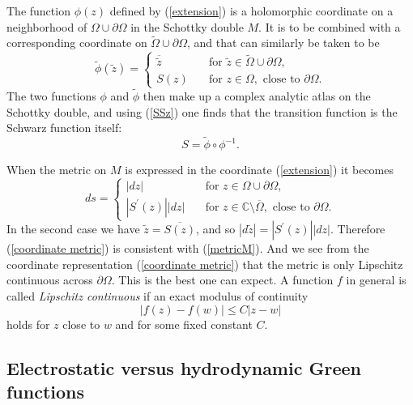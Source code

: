 \documentclass[reqno,12pt]{article}
\theoremstyle{plain}
\theoremstyle{definition}
\numberwithin{equation}{section}
\numberwithin{figure}{section}
\def\C{{\mathbb C}}
\begin{document}
The function $\phi(z)$ defined by (\ref{extension}) is a holomorphic coordinate on a neighborhood of $\Omega\cup\partial\Omega$
in the Schottky double $M$. It is to be combined with a corresponding coordinate on $\tilde{\Omega}\cup\partial\Omega$,
and that can similarly be taken to be
\begin{equation}\label{extensionbackside}
\tilde{\phi}(\tilde{z})=
\begin{cases}
\overline{\tilde{z}}\quad &\text{for }\tilde{z}\in\tilde{\Omega}\cup \partial\Omega,\\
{S({{z}})}\quad&\text{for }{z}\in {\Omega},\text{ close to }\partial\Omega.
\end{cases}
\end{equation} 
The two functions $\phi$ and $\tilde{\phi}$ then make up a complex analytic  atlas on the Schottky double, and using (\ref{SSz})
one finds that the transition function is the Schwarz function itself:
\begin{equation}\label{Sphi}
S=\tilde{\phi}\circ \phi^{-1}.
\end{equation}

When the metric on $M$ is expressed in the coordinate (\ref{extension}) it becomes
\begin{equation}\label{coordinate metric}
ds=
\begin{cases}
|dz|\quad &\text{for }z\in\Omega\cup \partial\Omega,\\
|S^\prime({z})||d{z}|\quad&\text{for }{z}\in \C\setminus\overline{\Omega},\text{ close to }\partial\Omega.
\end{cases}
\end{equation}
In the second case we have $\tilde{z}=\overline{S(z)}$, and so $|d\tilde{z}|=|S^\prime({z})||d{z}|$. 
Therefore (\ref{coordinate metric}) is consistent with (\ref{metricM}).
And we see from the coordinate representation (\ref{coordinate metric}) that the metric is only Lipschitz continuous across $\partial\Omega$. 
This is the best one can expect. A function $f$ in general is called {\it Lipschitz continuous} if an exact modulus of continuity
$$
|f(z)-f(w)|\leq C |z-w|
$$
holds for $z$ close to $w$ and for some fixed constant $C$.


\subsection{Electrostatic versus hydrodynamic Green functions}\label{sec:electro-hydro}
\end{document}
